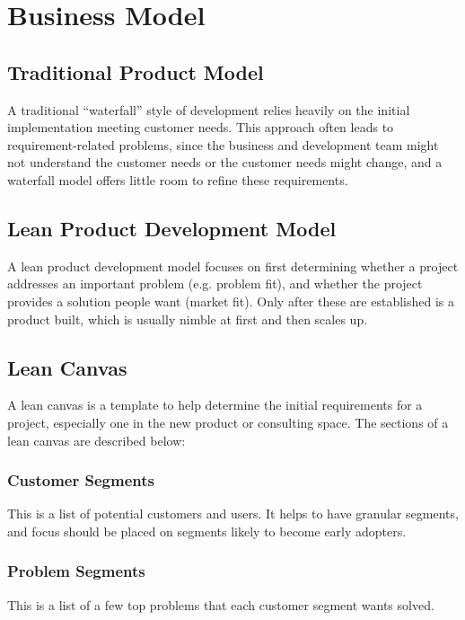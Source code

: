 \documentclass[12pt,titlepage]{article}
\begin{document}
  \newpage

  \section{Business Model}
    \subsection{Traditional Product Model}
      A traditional ``waterfall'' style of development relies heavily on the initial implementation meeting customer needs. This
      approach often leads to requirement-related problems, since the business and development team might not understand the
      customer needs or the customer needs might change, and a waterfall model offers little room to refine these requirements.

    \subsection{Lean Product Development Model}
      A lean product development model focuses on first determining whether a project addresses an important problem (e.g. problem
      fit), and whether the project provides a solution people want (market fit). Only after these are established is a product built,
      which is usually nimble at first and then scales up.

    \subsection{Lean Canvas}
      A lean canvas is a template to help determine the initial requirements for a project, especially one in the new product or
      consulting space. The sections of a lean canvas are described below:

      \subsubsection{Customer Segments}
        This is a list of potential customers and users. It helps to have granular segments, and focus should be placed on segments likely
        to become early adopters.

      \subsubsection{Problem Segments}
        This is a list of a few top problems that each customer segment wants solved.
\end{document}
